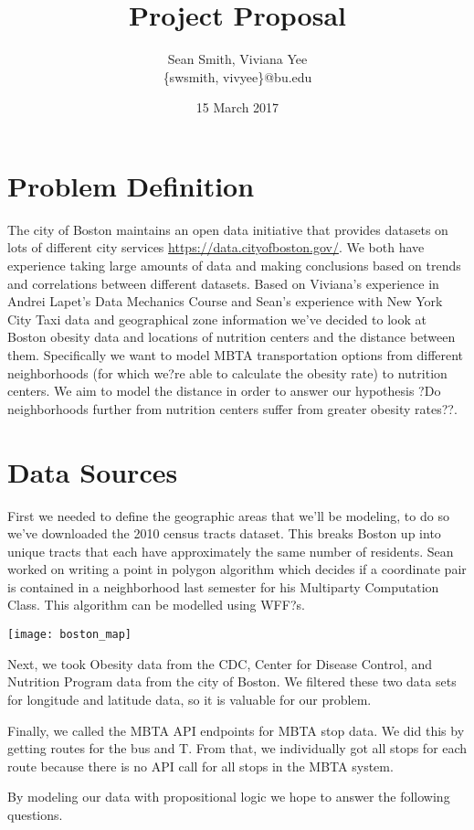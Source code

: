 \documentclass[12pt]{article}
\title{Project Proposal}
\author{Sean Smith, Viviana Yee \\ \{swsmith, vivyee\}@bu.edu}
\date{15 March 2017}
\begin{document}
\maketitle


\section{Problem Definition}
The city of Boston maintains an open data initiative that provides datasets on lots of different city services \url{https://data.cityofboston.gov/}. We both have experience taking large amounts of data and making conclusions based on trends and correlations between different datasets. Based on Viviana's experience in Andrei Lapet's Data Mechanics Course and Sean's experience with New York City Taxi data and geographical zone information we've decided to look at Boston obesity data and locations of nutrition centers and the distance between them. Specifically we want to model MBTA transportation options from different neighborhoods (for which we?re able to calculate the obesity rate) to nutrition centers. We aim to model the distance in order to answer our hypothesis ?Do neighborhoods further from nutrition centers suffer from greater obesity rates??. 
 
 \section{Data Sources}
 First we needed to define the geographic areas that we'll be modeling, to do so we've downloaded the 2010 census tracts dataset. This breaks Boston up into unique tracts that each have approximately the same number of residents. Sean worked on writing a point in polygon algorithm which decides if a coordinate pair is contained in a neighborhood last semester for his Multiparty Computation Class. This algorithm can be modelled using WFF?s.

\texttt{[image: boston\_map]}

Next, we took Obesity data from the CDC, Center for Disease Control, and Nutrition Program data from the city of Boston. We filtered these two data sets for longitude and latitude data, so it is valuable for our problem.

Finally, we called the MBTA API endpoints for MBTA stop data. We did this by getting routes for the bus and T. From that, we individually got all stops for each route because there is no API call for all stops in the MBTA system. 

 By modeling our data with propositional logic we hope to answer the following questions. 
\end{document}
